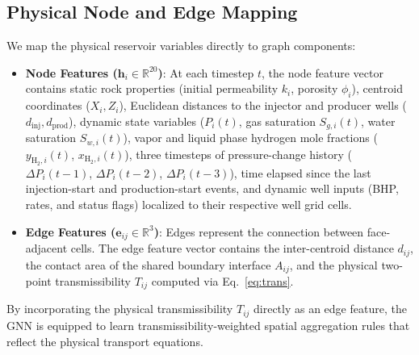 \subsection{Physical Node and Edge Mapping}
We map the physical reservoir variables directly to graph components:
\begin{itemize}
    \item \textbf{Node Features ($\mathbf{h}_i \in \mathbb{R}^{20}$)}: At each timestep $t$, the node feature vector contains static rock properties (initial permeability $k_i$, porosity $\phi_i$), centroid coordinates ($X_i, Z_i$), Euclidean distances to the injector and producer wells ($d_{\text{inj}}, d_{\text{prod}}$), dynamic state variables ($P_i(t)$, gas saturation $S_{g,i}(t)$, water saturation $S_{w,i}(t)$), vapor and liquid phase hydrogen mole fractions ($y_{\text{H}_2,i}(t)$, $x_{\text{H}_2,i}(t)$), three timesteps of pressure-change history ($\Delta P_i(t-1)$, $\Delta P_i(t-2)$, $\Delta P_i(t-3)$), time elapsed since the last injection-start and production-start events, and dynamic well inputs (BHP, rates, and status flags) localized to their respective well grid cells.
    \item \textbf{Edge Features ($\mathbf{e}_{ij} \in \mathbb{R}^{3}$)}: Edges represent the connection between face-adjacent cells. The edge feature vector contains the inter-centroid distance $d_{ij}$, the contact area of the shared boundary interface $A_{ij}$, and the physical two-point transmissibility $T_{ij}$ computed via Eq.~\ref{eq:trans}.
\end{itemize}

By incorporating the physical transmissibility $T_{ij}$ directly as an edge feature, the GNN is equipped to learn transmissibility-weighted spatial aggregation rules that reflect the physical transport equations.

